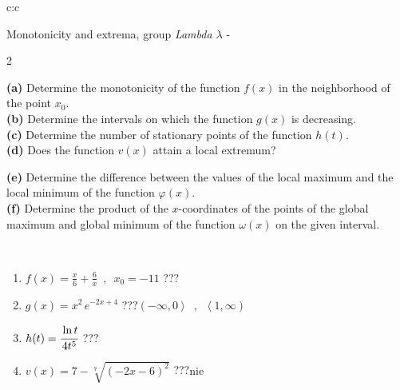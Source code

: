 \documentclass[10pt]{report}
\begin{document}
\begin{tabular}{c:c}
\begin{minipage}[c][104.5mm][t]{0.5\linewidth}
\begin{center}
\vspace{5mm}
{\huge Monotonicity and extrema, group \textit{Lambda $\lambda$} -}\\[5mm]
\begin{minipage}{0.95\linewidth}
\begin{center}
{\small \begin{multicols}{2} \raggedright
\textbf{(a)} Determine the monotonicity of the function \(f(x)\) in the neighborhood of the point \(x_0\). \\[1mm]
\textbf{(b)} Determine the intervals on which the function \(g(x)\) is decreasing. \\[1mm]
\textbf{(c)} Determine the number of stationary points of the function \(h(t)\). \\[1mm]
\textbf{(d)} Does the function \(v(x)\) attain a local extremum? \par \columnbreak
\textbf{(e)} Determine the difference between the values of the local maximum and the local minimum of the function \(\varphi(x)\). \\[1mm]
\textbf{(f)} Determine the product of the \(x\)-coordinates of the points of the global maximum and global minimum of the function \(\omega(x)\) on the given interval. \\[1mm]
\end{multicols}
}
\end{center}
\end{minipage}
\\[1mm]
\begin{minipage}{0.79\linewidth}
\begin{center}
\begin{varwidth}{\linewidth}
\setlength{\itemsep}{0pt}
\begin{enumerate}
\normalsize
\item $f(x)=\frac{x}{6}+\frac{6}{x} \enspace , \enspace x_0=-11$\quad \dotfill\; ???\;\dotfill \quad {}
\item $g(x)=x^2\, e^{-2x+4}$\quad \dotfill\; ???\;\dotfill \quad $\left(-\infty , 0\right\rangle\enspace , \enspace \left\langle1 , \infty\right)$
\item $h(t)=\cfrac{\ln t}{4t^5}$\quad \dotfill\; ???\;\dotfill {}
\item $v(x)=7-\sqrt[7]{(-2x-6)^2}$\quad \dotfill\; ???\;\dotfill \quad $\text{nie}$

\end{enumerate}
\end{varwidth}
\end{center}
\end{minipage}
\end{center}
\end{minipage}
\end{tabular}
\end{document}
